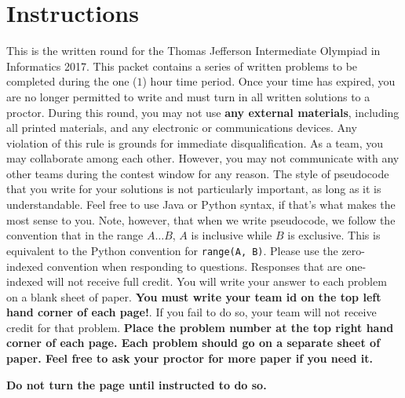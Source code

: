 \section*{Instructions}

This is the written round for the Thomas Jefferson Intermediate Olympiad in Informatics 2017.  This packet contains a series of written problems to be completed during the one ($1$) hour time period.  Once your time has expired, you are no longer permitted to write and must turn in all written solutions to a proctor.
\blank
During this round, you may not use \textbf{any external materials}, including all printed materials, and any electronic or communications devices. Any violation of this rule is grounds for immediate disqualification.
\blank
As a team, you may collaborate among each other. However, you may not communicate with any other teams during the contest window for any reason.
\blank
The style of pseudocode that you write for your solutions is not particularly important, as long as it is understandable. Feel free to use Java or Python syntax, if that's what makes the most sense to you. Note, however, that when we write pseudocode, we follow the convention that in the range $A \dots B$, $A$ is inclusive while $B$ is exclusive. This is equivalent to the Python convention for \verb|range(A, B)|.
\blank
Please use the zero-indexed convention when responding to questions. Responses that are one-indexed will not receive full credit.
\blank
You will write your answer to each problem on a blank sheet of paper. \textbf{You must write your team id on the top left hand corner of each page!}. If you fail to do so, your team will not receive credit for that problem. \textbf{Place the problem number at the top right hand corner of each page. Each problem should go on a separate sheet of paper. Feel free to ask your proctor for more paper if you need it.} 
\blank
\begin{center}
    \textbf{\Large Do not turn the page until instructed to do so.}
\end{center}

